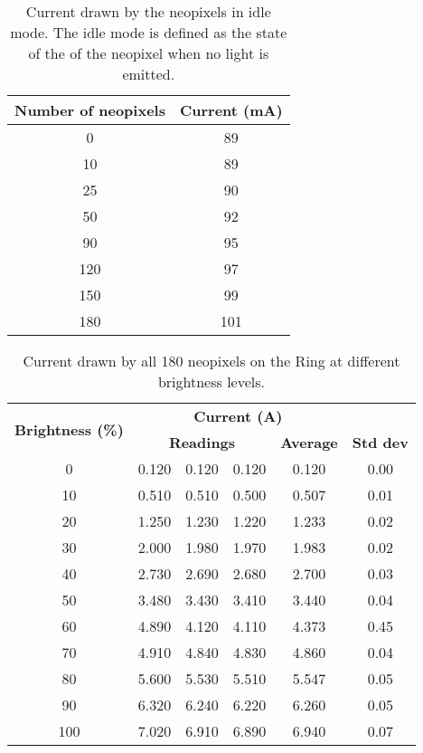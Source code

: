 \begin{table}[h!]
	\centering
	\caption{Current drawn by the neopixels in idle mode. The idle mode is defined as the state of the of the neopixel when no light is emitted.}
	\label{table:current_idle}
	\begin{tabular}{cc}
		\hline
		\hline
		\toprule
		\textbf{Number of neopixels} & \textbf{Current (mA)}\\
		\bottomrule
		\toprule
		0    &    89    \\
		10    &    89    \\
		25    &    90    \\
		50    &    92    \\
		90    &    95    \\
		120    &    97    \\
		150    &    99    \\
		180    &    101    \\
		\bottomrule
		\hline
		\hline
	\end{tabular}
\end{table}		
\begin{table}[h!]
	\centering
	\caption{Current drawn by all 180 neopixels on the Ring at different brightness levels.}
	\label{table:current_180_neopixels}
	\begin{tabular}{cccccc}
		\hline
		\hline
		\toprule
		\multirow{2}{*}{\textbf{Brightness (\%)}} & \multicolumn{4}{c}{\textbf{Current (A)}}\\
		& \multicolumn{3}{c}{\textbf{Readings}} & \textbf{Average} & \textbf{Std dev} \\
		\bottomrule
		\toprule
		0	&	0.120	&	0.120	&	0.120	&	0.120	&	0.00	\\
		10	&	0.510	&	0.510	&	0.500	&	0.507	&	0.01	\\
		20	&	1.250	&	1.230	&	1.220	&	1.233	&	0.02	\\
		30	&	2.000	&	1.980	&	1.970	&	1.983	&	0.02	\\
		40	&	2.730	&	2.690	&	2.680	&	2.700	&	0.03	\\
		50	&	3.480	&	3.430	&	3.410	&	3.440	&	0.04	\\
		60	&	4.890	&	4.120	&	4.110	&	4.373	&	0.45	\\
		70	&	4.910	&	4.840	&	4.830	&	4.860	&	0.04	\\
		80	&	5.600	&	5.530	&	5.510	&	5.547	&	0.05	\\
		90	&	6.320	&	6.240	&	6.220	&	6.260	&	0.05	\\
		100	&	7.020	&	6.910	&	6.890	&	6.940	&	0.07	\\
		\bottomrule
		\hline
		\hline
	\end{tabular}
\end{table}				

